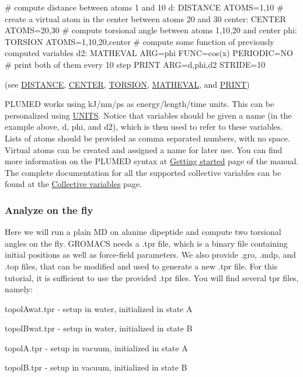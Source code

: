 \begin{DoxyVerb}# compute distance between atoms 1 and 10
d: DISTANCE ATOMS=1,10
# create a virtual atom in the center between atoms 20 and 30
center: CENTER ATOMS=20,30
# compute torsional angle between atoms 1,10,20 and center
phi: TORSION ATOMS=1,10,20,center
# compute some function of previously computed variables
d2: MATHEVAL ARG=phi FUNC=cos(x) PERIODIC=NO
# print both of them every 10 step
PRINT ARG=d,phi,d2 STRIDE=10
\end{DoxyVerb}
 (see \hyperlink{DISTANCE}{D\+I\+S\+T\+A\+N\+C\+E}, \hyperlink{CENTER}{C\+E\+N\+T\+E\+R}, \hyperlink{TORSION}{T\+O\+R\+S\+I\+O\+N}, \hyperlink{MATHEVAL}{M\+A\+T\+H\+E\+V\+A\+L}, and \hyperlink{PRINT}{P\+R\+I\+N\+T})

P\+L\+U\+M\+E\+D works using k\+J/nm/ps as energy/length/time units. This can be personalized using \hyperlink{UNITS}{U\+N\+I\+T\+S}. Notice that variables should be given a name (in the example above, {\ttfamily d}, {\ttfamily phi}, and {\ttfamily d2}), which is then used to refer to these variables. Lists of atoms should be provided as comma separated numbers, with no space. Virtual atoms can be created and assigned a name for later use. You can find more information on the P\+L\+U\+M\+E\+D syntax at \hyperlink{_syntax}{Getting started} page of the manual. The complete documentation for all the supported collective variables can be found at the \hyperlink{colvarintro}{Collective variables} page.\hypertarget{munster_munster-monitor-of}{}\subsubsection{Analyze on the fly}\label{munster_munster-monitor-of}
Here we will run a plain M\+D on alanine dipeptide and compute two torsional angles on the fly. G\+R\+O\+M\+A\+C\+S needs a .tpr file, which is a binary file containing initial positions as well as force-\/field parameters. We also provide .gro, .mdp, and .top files, that can be modified and used to generate a new .tpr file. For this tutorial, it is sufficient to use the provided .tpr files. You will find several tpr files, namely\+:
\begin{DoxyItemize}
\item topol\+Awat.\+tpr -\/ setup in water, initialized in state A
\item topol\+Bwat.\+tpr -\/ setup in water, initialized in state B
\item topol\+A.\+tpr -\/ setup in vacuum, initialized in state A
\item topol\+B.\+tpr -\/ setup in vacuum, initialized in state B
\end{DoxyItemize}

